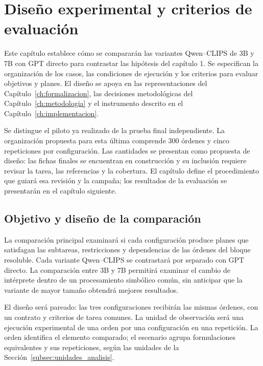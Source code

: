 \chapter{Diseño experimental y criterios de evaluación}
\label{ch:validacion_experimentacion}

Este capítulo establece cómo se compararán las variantes Qwen--CLIPS de
3B y 7B con GPT directo para contrastar las hipótesis del
capítulo 1. Se especifican la organización de los casos, las condiciones
de ejecución y los criterios para evaluar objetivos y planes. El diseño
se apoya en las representaciones del Capítulo~\ref{ch:formalizacion},
las decisiones metodológicas del Capítulo~\ref{ch:metodologia} y el
instrumento descrito en el Capítulo~\ref{ch:implementacion}.

Se distingue el piloto ya realizado de la prueba final independiente.
La organización propuesta para esta última comprende 300 órdenes y
cinco repeticiones por configuración. Las cantidades se presentan como
propuesta de diseño: las fichas finales se encuentran en construcción
y su inclusión requiere revisar la tarea, las referencias y la cobertura.
El capítulo define el procedimiento que guiará esa revisión y la campaña;
los resultados de la evaluación se presentarán en el capítulo siguiente.

\section{Objetivo y diseño de la comparación}
\label{sec:diseno_experimental_cap6}

La comparación principal examinará si cada configuración produce planes
que satisfagan las subtareas, restricciones y dependencias de las órdenes
del bloque resoluble. Cada variante Qwen--CLIPS se contrastará por separado
con GPT directo. La comparación entre 3B y 7B permitirá examinar el cambio
de intérprete dentro de un procesamiento simbólico común, sin anticipar
que la variante de mayor tamaño obtendrá mejores resultados.

El diseño será pareado: las tres configuraciones recibirán las mismas
órdenes, con un contrato y criterios de tarea comunes. La unidad de
observación será una ejecución experimental de una orden por una
configuración en una repetición. La orden identifica el elemento comparado;
el escenario agrupa formulaciones equivalentes y sus repeticiones,
según las unidades de la Sección~\ref{subsec:unidades_analisis}.

